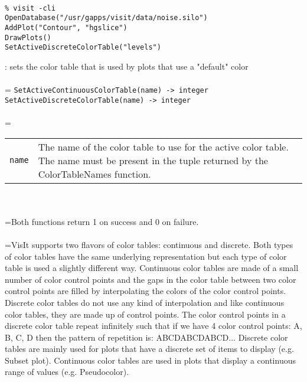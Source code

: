 \documentclass[10pt,a4paper]{report}
\begin{document}
\\[-6mm]
\begin{verbatim}% visit -cli
OpenDatabase("/usr/gapps/visit/data/noise.silo")
AddPlot("Contour", "hgslice")
DrawPlots()
SetActiveDiscreteColorTable("levels")
\end{verbatim}
\newpage


{}
: sets the color table that is used by plots that use a "default" color\\[-3mm]

 \\ 
\hangindent=\parindent 
\verb!SetActiveContinuousColorTable(name) -> integer!\\ 
\verb!SetActiveDiscreteColorTable(name) -> integer!\\ [-3mm]

 \\ 
\hangindent=\parindent 
\begin{tabular}{lp{9cm}}
\verb!name! & The name of the color table to use for the active color table. The name must be present in the tuple returned by the ColorTableNames function. \\
\end{tabular} \\[-2mm]


 \\ 
\hangindent=\parindent Both functions return 1 on success and 0 on failure. \\[-3mm] 

 \\ 
\hangindent=\parindent VisIt supports two flavors of color tables: continuous and discrete. Both types of color tables have the same underlying representation but each type of color table is used a slightly different way. Continuous color tables are made of a small number of color control points and the gaps in the color table between two color control points are filled by interpolating the colors of the color control points. Discrete color tables do not use any kind of interpolation and like continuous color tables, they are made up of control points. The color control points in a discrete color table repeat infinitely such that if we have 4 color control points: A, B, C, D then the pattern of repetition is: ABCDABCDABCD... Discrete color tables are mainly used for plots that have a discrete set of items to display (e.g. Subset plot). Continuous color tables are used in plots that display a continuous range of values (e.g. Pseudocolor). \\[-3mm] 
\end{document}
